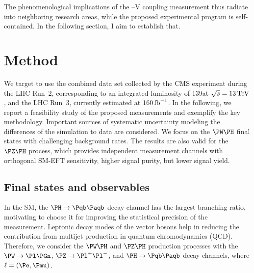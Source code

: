 \documentclass[a4paper,11pt]{article}
\newcommand{\Pb}{{{\Pqb}}\xspace}
\newcommand{\PAb}{{{{\Paqb}}}\xspace}
\renewcommand{\PV}{{{{V}}}\xspace}
\begin{document}
The phenomenological implications of the \PH--\PV coupling measurement thus radiate into neighboring research areas, while the proposed experimental program is self-contained.
In the following section, I aim to establish that. 

\section{Method}
\label{sec:method}

We target to use the combined data set collected by the CMS experiment during the LHC Run~2, corresponding to an integrated luminosity of 139\fbinv at $\sqrt{s}=13\,\text{Te\hspace{-.08em}V}$, and the LHC Run~3, currently estimated at $160\mbox{\ensuremath{\,\text{fb}^{-1}}}$.
In the following, we report 
a feasibility study of the proposed measurements and exemplify the key methodology.
Important sources of systematic uncertainty modeling the differences of the simulation to data are considered. 
We focus on the $\PW\PH$ final states with challenging background rates. The results are also valid for the $\PZ\PH$ process, which provides independent measurement channels with orthogonal SM-EFT sensitivity, higher signal purity, but lower signal yield.

\subsection{Final states and observables}

In the SM, the $\PH\rightarrow\Pb \PAb$ decay channel has the largest branching ratio, motivating to choose it for improving  the statistical precision of the measurement.
Leptonic decay modes of the vector bosons help in reducing 
the contribution
from multijet production in quantum chromodynamics (QCD).
Therefore, we consider the $\PW\PH$ and $\PZ\PH$ production processes with the $\PW\rightarrow\Pl\Pgn$, $\PZ\rightarrow{\Pl}^{+} {\Pl}^{-}$, and $\PH\rightarrow\Pb\PAb $ decay channels, where $\ell=(\Pe, \Pmu)$.
\end{document}
